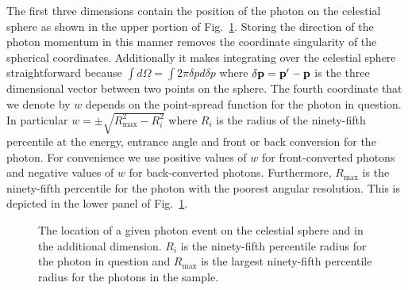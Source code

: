 \documentclass[useAMS,usenatbib]{mn2e}
\newcommand\pgfmathsinandcos[3]{%
  \pgfmathsetmacro#1{sin(#3)}%
  \pgfmathsetmacro#2{cos(#3)}%
}
\newcommand\LongitudePlane[3][current plane]{%
  \pgfmathsinandcos\sinEl\cosEl{#2} %
  \pgfmathsinandcos\sint\cost{#3} %
  \tikzset{#1/.style={cm={\cost,\sint*\sinEl,0,\cosEl,(0,0)}}}
}
\newcommand\LatitudePlane[3][current plane]{%
  \pgfmathsinandcos\sinEl\cosEl{#2} %
  \pgfmathsinandcos\sint\cost{#3} %
  \pgfmathsetmacro\yshift{\cosEl*\sint}
  \tikzset{#1/.style={cm={\cost,0,0,\cost*\sinEl,(0,\yshift)}}} %
}
\newcommand\DrawLongitudeCircle[2][1]{
  \LongitudePlane{\angEl}{#2}
  \tikzset{current plane/.prefix style={scale=#1}}
  \pgfmathsetmacro\angVis{atan(sin(#2)*cos(\angEl)/sin(\angEl))} %
  \draw[current plane] (\angVis:1) arc (\angVis:\angVis+180:1);
  \draw[current plane,dashed] (\angVis-180:1) arc (\angVis-180:\angVis:1);
}
\newcommand\DrawLatitudeCircle[2][1]{
  \LatitudePlane{\angEl}{#2}
  \tikzset{current plane/.prefix style={scale=#1}}
  \pgfmathsetmacro\sinVis{sin(#2)/cos(#2)*sin(\angEl)/cos(\angEl)}
  \pgfmathsetmacro\angVis{asin(min(1,max(\sinVis,-1)))}
  \draw[current plane] (\angVis:1) arc (\angVis:-\angVis-180:1);
  \draw[current plane,dashed] (180-\angVis:1) arc (180-\angVis:\angVis:1);
}
\begin{document}
The first three dimensions contain the position of the photon on the
celestial sphere as shown in the upper portion of
Fig.~\ref{fig:sphere}.  Storing the direction of the photon momentum
in this manner removes the coordinate singularity of the spherical
coordinates.  Additionally it makes integrating over the celestial
sphere straightforward because $\int d\Omega = \int 2\pi \delta p d
\delta p$ where $\delta {\bf p} = {\bf p}' - {\bf p}$ is the three
dimensional vector between two points on the sphere.  The fourth
coordinate that we denote by $w$ depends on the point-spread function
for the photon in question.  In particular $w=\pm
\sqrt{R^2_\mathrm{max}-R_i^2}$ where $R_i$ is the radius of the
ninety-fifth percentile at the energy, entrance angle and front or
back conversion for the photon.  For convenience we use positive
values of $w$ for front-converted photons and negative values of $w$
for back-converted photons.  Furthermore, $R_\mathrm{max}$ is the
ninety-fifth percentile for the photon with the poorest angular
resolution.  This is depicted in the lower panel of
Fig.~\ref{fig:sphere}.
\begin{figure}
\caption{The location of a given photon event on the celestial sphere
  and in the additional dimension. $R_i$ is the ninety-fifth
  percentile radius for the photon in question and $R_\mathrm{max}$ is
  the largest ninety-fifth percentile radius for the photons in the
  sample.}
\label{fig:sphere}
\end{figure}
\end{document}
